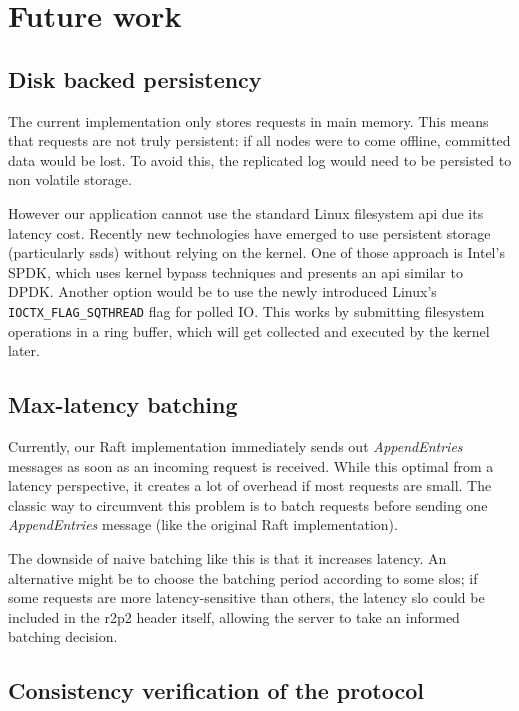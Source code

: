 \chapter{Future work}

\section{Disk backed persistency}

The current implementation only stores requests in main memory.
This means that requests are not truly persistent: if all nodes were to come offline, committed data would be lost.
To avoid this, the replicated log would need to be persisted to non volatile storage.

However our application cannot use the standard Linux filesystem \gls{api} due its latency cost.
Recently new technologies have emerged to use persistent storage (particularly \glspl{ssd}) without relying on the kernel.
One of those approach is Intel's SPDK\cite{spdk}, which uses kernel bypass techniques and presents an \gls{api} similar to DPDK.
Another option would be to use the newly introduced Linux's \texttt{IOCTX\_FLAG\_SQTHREAD} flag for polled IO.
This works by submitting filesystem operations in a ring buffer, which will get collected and executed by the kernel later.

\section{Max-latency batching}

Currently, our Raft implementation immediately sends out \emph{AppendEntries} messages as soon as an incoming request is received.
While this optimal from a latency perspective, it creates a lot of overhead if most requests are small.
The classic way to circumvent this problem is to batch requests before sending one \emph{AppendEntries} message (\ie like the original Raft implementation\cite{raft}).

The downside of naive batching like this is that it increases latency.
An alternative might be to choose the batching period according to some \glspl{slo};
if some requests are more latency-sensitive than others, the latency \gls{slo} could be included in the \gls{r2p2} header itself, allowing the server to take an informed batching decision.


\section{Consistency verification of the protocol}


